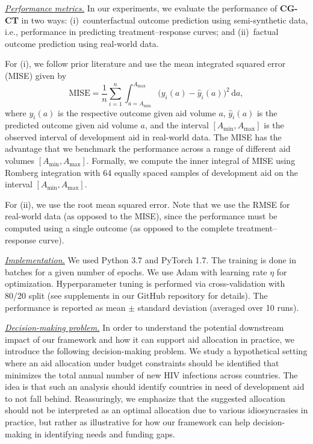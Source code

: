 \documentclass[sigconf]{acmart}
\newcommand{\framework}{\textbf{\mbox{CG-CT}}\xspace}
\begin{document}
\noindent
\underline{\emph{Performance metrics.}} In our experiments, we evaluate the performance of \framework in two ways: (i)~counterfactual outcome prediction using semi-synthetic data, i.e., performance in predicting treatment--response curves; and (ii)~factual outcome prediction using real-world data. 

For (i), we follow prior literature \cite{Schwab2020} and use the mean integrated squared error (MISE) given by
\begin{equation}
\label{eq:mise}
\mathrm{MISE} = \frac{1}{n}\sum_{i=1}^n \int_{a = A_{\mathrm{min}}}^{A_{\mathrm{max}}} \big( y_i(a) - \hat{y}_i(a) \big)^2 \, \mathrm{d}a ,
\end{equation}
where $y_i (a)$ is the respective outcome given aid volume $a$, $\hat{y}_i (a)$ is the predicted outcome given aid volume $a$, and the interval $[A_{\mathrm{min}}, A_{\mathrm{max}}]$ is the observed interval of development aid in real-world data. The MISE has the advantage that we benchmark the performance across a range of different aid volumes $[A_{\mathrm{min}}, A_{\mathrm{max}}]$. Formally, we compute the inner integral of MISE using Romberg integration with 64 equally spaced samples of development aid on the interval $[A_{\mathrm{min}}, A_{\mathrm{max}}]$. %

For (ii), we use the root mean squared error. Note that we use the RMSE for real-world data (as opposed to the MISE), since the performance must be computed using a single outcome (as opposed to the complete treatment--response curve).

\noindent
\underline{\emph{Implementation.}} We used Python 3.7 and PyTorch 1.7. The training is done in batches for a given number of epochs. We use Adam \cite{Kingma2015} with learning rate $\eta$ for optimization.  Hyperparameter tuning is performed via cross-validation with 80/20 split (see supplements in our GitHub repository for details). The performance is reported as mean $\pm$ standard deviation (averaged over 10 runs).

\noindent
\underline{\emph{Decision-making problem.}} In order to understand the potential downstream impact of our framework and how it can support aid allocation in practice, we introduce the following decision-making problem. We study a hypothetical setting where an aid allocation under budget constraints should be identified that minimizes the total annual number of new HIV infections across countries. The idea is that such an analysis should identify countries in need of development aid to not fall behind. Reassuringly, we emphasize that the suggested allocation should not be interpreted as an optimal allocation due to various idiosyncrasies in practice, but rather as illustrative for how our framework can help decision-making in identifying needs and funding gaps. 
\end{document}

